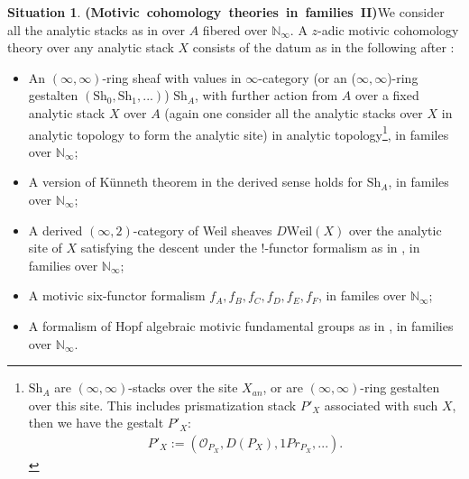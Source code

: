 \documentclass[12pt]{article}
\theoremstyle{definition}
\newtheorem{situation}{Situation}
\begin{document}
\begin{situation}\mbox{\textbf{(Motivic cohomology theories in families II)}}\label{situation2}
We consider all the analytic stacks as in \cite{3CS1} over $A$ fibered over $\mathbb{N}_\infty$. A $z$-adic motivic cohomology theory over any analytic stack $X$ consists of the datum as in the following after \cite{3A}:
\begin{itemize}\setlength{\itemsep}{-0.1cm}
\item[A1] An $(\infty,\infty)$-ring sheaf with values in $\infty$-category (or an ($\infty,\infty$)-ring gestalten $(\mathrm{Sh}_0, \mathrm{Sh}_1,...)$) $\mathrm{Sh}_A$, with further action from $A$ over a fixed analytic stack $X$ over $A$ (again one consider all the analytic stacks over $X$ in analytic topology to form the analytic site) in analytic topology\footnote{$\mathrm{Sh}_A$ are $(\infty,\infty)$-stacks over the site $X_{an}$, or are $(\infty,\infty)$-ring gestalten over this site. This includes prismatization stack $P'_X$ associated with such $X$, then we have the gestalt $P'_X$:
\begin{align}
P'_X := (\mathcal{O}_{P_X}, D(P_X), 1Pr_{P_X},...).
\end{align}}, in familes over $\mathbb{N}_\infty$;
\item[A2] A version of K\"unneth theorem in the derived sense holds for $\mathrm{Sh}_A$, in familes over $\mathbb{N}_\infty$;
\item[A3] A derived $(\infty,2)$-category of Weil sheaves $D\mathrm{Weil}(X)$ over the analytic site of $X$ satisfying the descent under the !-functor formalism as in \cite{3CS1}, in families over $\mathbb{N}_\infty$; 
\item[A4] A motivic six-functor formalism $f_A,f_B,f_C,f_D,f_E,f_F$, in familes over $\mathbb{N}_\infty$;
\item[A5] A formalism of Hopf algebraic motivic fundamental groups as in \cite[4.7]{3A}, in families over $\mathbb{N}_\infty$.

\end{itemize}
\end{situation}
\end{document}
